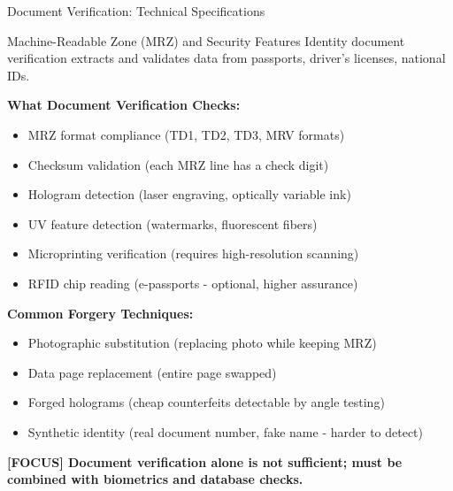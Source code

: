 \documentclass[11pt,a4paper]{beamer}
\newcommand{\examfocus}[1]{\textcolor{orange!80!black}{\textbf{[FOCUS] #1}}}
\begin{document}
\begin{frame}{Document Verification: Technical Specifications}
	\begin{block}{Machine-Readable Zone (MRZ) and Security Features}
		Identity document verification extracts and validates data from passports, driver's licenses, national IDs.
	\end{block}
	\textbf{What Document Verification Checks:}
	\begin{itemize}
		\item MRZ format compliance (TD1, TD2, TD3, MRV formats)
		\item Checksum validation (each MRZ line has a check digit)
		\item Hologram detection (laser engraving, optically variable ink)
		\item UV feature detection (watermarks, fluorescent fibers)
		\item Microprinting verification (requires high-resolution scanning)
		\item RFID chip reading (e-passports - optional, higher assurance)
	\end{itemize}
	\textbf{Common Forgery Techniques:}
	\begin{itemize}
		\item Photographic substitution (replacing photo while keeping MRZ)
		\item Data page replacement (entire page swapped)
		\item Forged holograms (cheap counterfeits detectable by angle testing)
		\item Synthetic identity (real document number, fake name - harder to detect)
	\end{itemize}
	\examfocus{Document verification alone is not sufficient; must be combined with biometrics and database checks.}
\end{frame}
\end{document}
